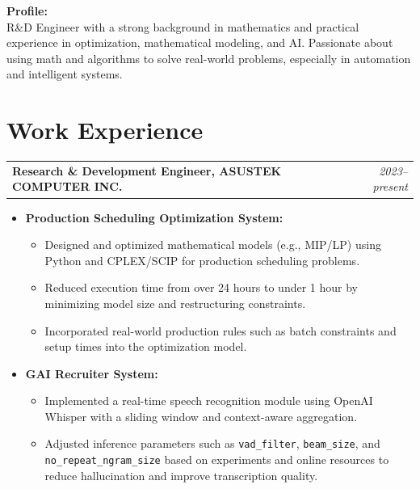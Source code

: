\documentclass[a4paper,10pt]{article}
\newcommand{\coloredsection}[1]{\section*{\textcolor{blue!70!black}{#1}}}
\begin{document}
\vspace{0.5cm}
\noindent
\textbf{Profile:} \\
R\&D Engineer with a strong background in mathematics and practical experience in optimization, mathematical modeling, and AI. Passionate about using math and algorithms to solve real-world problems, especially in automation and intelligent systems.


\vspace{0.5cm}
\coloredsection{Work Experience}
\begin{tabularx}{\textwidth}{Xr}
    \textbf{Research \& Development Engineer, ASUSTEK COMPUTER INC.} & \textit{2023--present} \\
\end{tabularx}
\begin{itemize}[leftmargin=30pt]
    \item \textbf{Production Scheduling Optimization System:}
    \begin{itemize}
        \item Designed and optimized mathematical models (e.g., MIP/LP) using Python and CPLEX/SCIP for production scheduling problems.
        \item Reduced execution time from over 24 hours to under 1 hour by minimizing model size and restructuring constraints.
        \item Incorporated real-world production rules such as batch constraints and setup times into the optimization model.
    \end{itemize}
    \item \textbf{GAI Recruiter System:}
    \begin{itemize}
        \item Implemented a real-time speech recognition module using OpenAI Whisper with a sliding window and context-aware aggregation.
        \item Adjusted inference parameters such as \texttt{vad\_filter}, \texttt{beam\_size}, and \texttt{no\_repeat\_ngram\_size} based on experiments and online resources to reduce hallucination and improve transcription quality.
    \end{itemize}
\end{itemize}
\end{document}
